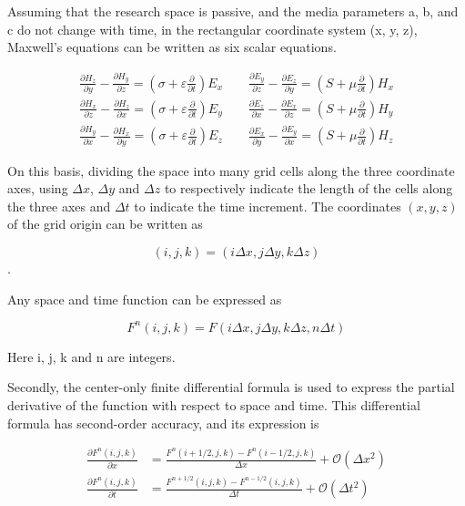 \documentclass[]{article}
\begin{document}
Assuming that the research space is passive, and the media parameters a, b, and c do not change with time, in the rectangular coordinate system (x, y, z), Maxwell's equations can be written as six scalar equations.

\begin{align*}
	\frac{\partial H_z}{\partial y} - \frac{\partial H_y}{\partial z} = (\sigma + \varepsilon \frac{\partial}{\partial t})E_x \qquad \frac{\partial E_y}{\partial z} - \frac{\partial E_z}{\partial y} = (S + \mu \frac{\partial}{\partial t})H_x \\
	\frac{\partial H_x}{\partial z} - \frac{\partial H_z}{\partial x} = (\sigma + \varepsilon \frac{\partial}{\partial t})E_y \qquad \frac{\partial E_z}{\partial x} - \frac{\partial E_x}{\partial z} = (S + \mu \frac{\partial}{\partial t})H_y \\
	\frac{\partial H_y}{\partial x} - \frac{\partial H_x}{\partial y} = (\sigma + \varepsilon \frac{\partial}{\partial t})E_z \qquad \frac{\partial E_x}{\partial y} - \frac{\partial E_y}{\partial x} = (S + \mu \frac{\partial}{\partial t})H_z 
\end{align*}

On this basis, dividing the space into many grid cells along the three coordinate axes, using $\Delta x$, $\Delta y$ and $\Delta z$ to respectively indicate the length of the cells along the three axes and $\Delta t$ to indicate the time increment. The coordinates $(x, y, z)$ of the grid origin can be written as 

$$(i, j, k) = (i\Delta x, j\Delta y, k\Delta z)$$. 

Any space and time function can be expressed as

$$F^n(i, j, k) = F(i\Delta x, j\Delta y, k\Delta z, n\Delta t)$$

Here i, j, k and n are integers.

Secondly, the center-only finite differential formula is used to express the partial derivative of the function with respect to space and time. This differential formula has second-order accuracy, and its expression is

\begin{align*}
	\frac{\partial F^n(i, j , k)}{\partial x} &= \frac{F^n(i+1/2, j , k) - F^n(i-1/2, j , k)}{\Delta x} + \mathcal O (\Delta x^2) \\ 
	\frac{\partial F^n(i, j , k)}{\partial t} &= \frac{F^{n+1/2}(i, j , k) - F^{n-1/2}(i, j , k)}{\Delta t} + \mathcal O (\Delta t^2) 
\end{align*}
\end{document}
